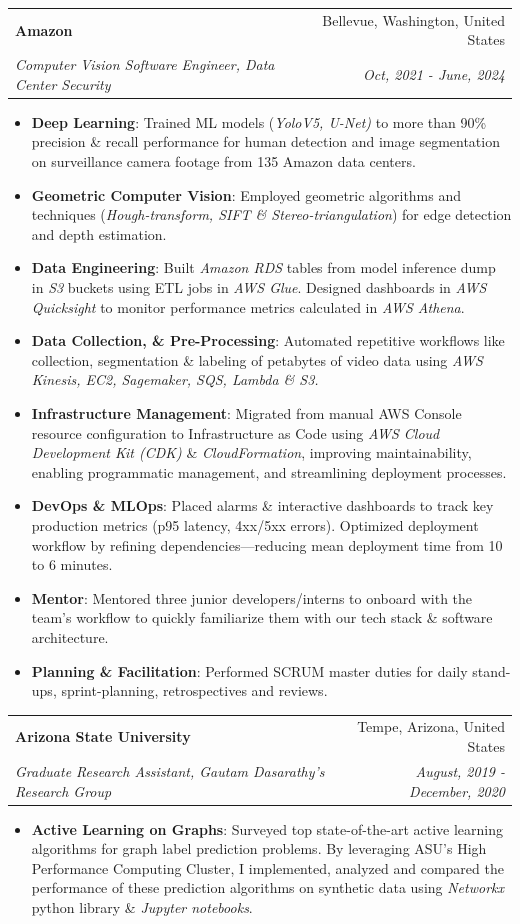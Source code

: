 \documentclass[letterpaper,11pt]{article}
\makeatletter
\newcommand{\resumeItem}[2]{
  \item\small{
    \textbf{#1}{: #2 \vspace{-2pt}}
  }
}
\newcommand{\resumeSubheading}[4]{
  \vspace{-1pt}\item
    \begin{tabular*}{0.97\textwidth}{l@{\extracolsep{\fill}}r}
      \textbf{#1} & #2 \\
      \textit{\small#3} & \textit{\small #4} \\
    \end{tabular*}\vspace{-5pt}
}
\newcommand{\resumeItemListStart}{\begin{itemize}}
\newcommand{\resumeItemListEnd}{\end{itemize}\vspace{-5pt}}
\makeatother
\begin{document}
    \resumeSubheading
      {Amazon}{Bellevue, Washington, United States}
      {Computer Vision Software Engineer, Data Center Security}{Oct, 2021 - June, 2024}
      \resumeItemListStart
        \resumeItem{Deep Learning}{Trained ML models (\textit{YoloV5, U-Net)} to more than 90\% precision \& recall performance for human detection and image segmentation on surveillance camera footage from 135 Amazon data centers.}
        \resumeItem{Geometric Computer Vision}
          {Employed geometric algorithms and techniques (\textit{Hough-transform, SIFT \& Stereo-triangulation}) for edge detection and depth estimation.}
        \resumeItem{Data Engineering}
          {Built \textit{Amazon RDS} tables from model inference dump in \textit{S3} buckets using ETL jobs in \textit{AWS Glue}. Designed dashboards in \textit{AWS Quicksight} to monitor performance metrics calculated in \emph{AWS Athena}.}
        \resumeItem{Data Collection, \& Pre-Processing}
          {Automated repetitive workflows like collection, segmentation \& labeling of petabytes of video data using \textit{AWS Kinesis, EC2, Sagemaker, SQS, Lambda \& S3.}}
        \resumeItem{Infrastructure Management}
          {Migrated from manual AWS Console resource configuration to Infrastructure as Code using \textit{AWS Cloud Development Kit (CDK)} \& \textit{CloudFormation}, improving maintainability, enabling programmatic management, and streamlining deployment processes.}
        \resumeItem{DevOps \& MLOps}
          {Placed alarms \& interactive dashboards to track key production metrics (p95 latency, 4xx/5xx errors). Optimized deployment workflow by refining dependencies—reducing mean deployment time from 10 to 6 minutes.}
        \resumeItem{Mentor} {Mentored three junior developers/interns to onboard with the team's workflow to quickly familiarize them with our tech stack \& software architecture.}
        \resumeItem{Planning \& Facilitation}{
        Performed SCRUM master duties for daily stand-ups, sprint-planning, retrospectives and reviews. 
        }
      \resumeItemListEnd

    \resumeSubheading
      {Arizona State University}{Tempe, Arizona, United States}
      {Graduate Research Assistant, Gautam Dasarathy's Research Group}{August, 2019 - December, 2020}
      \resumeItemListStart
        \resumeItem{Active Learning on Graphs}
          {Surveyed top state-of-the-art active learning algorithms for graph label prediction problems. By leveraging ASU's High Performance Computing Cluster, I implemented, analyzed and compared the performance of these prediction algorithms on synthetic data using \textit{Networkx} python library \& \textit{Jupyter notebooks}.}
      \resumeItemListEnd
\end{document}
